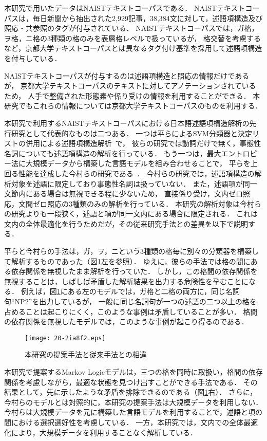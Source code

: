 \documentclass[japanese]{jnlp_1.4}
\begin{document}
本研究で用いたデータはNAISTテキストコーパスである．
NAISTテキストコーパスは，毎日新聞から抽出された2,929記事，38,384文に対して，述語項構造及び照応・共参照のタグが付与されている．
NAISTテキストコーパスでは，ガ格，ヲ格，ニ格の3種類の格のみを表層格レベルで扱っているが，
格交替を考慮するなど，京都大学テキストコーパスとは異なるタグ付け基準を採用して述語項構造を付与している．

NAISTテキストコーパスが付与するのは述語項構造と照応の情報だけであるが，
京都大学テキストコーパスのテキストに対してアノテーションされているため，
人手で整備された形態素や係り受けの情報を利用することができる．
本研究でもこれらの情報については京都大学テキストコーパスのものを利用する．

本研究で利用するNAISTテキストコーパスにおける日本語述語項構造解析の先行研究として代表的なものは二つある．
一つは平らによるSVM分類器と決定リストの併用による述語項構造解析~\cite{taira:2008:emnlp}で，
彼らの研究では動詞だけで無く，事態性名詞についても述語項構造の解析を行っている．
もう一つは，最大エントロピー法に大規模データから構築した言語モデルを組み合わせることで，
平らを上回る性能を達成した今村らの研究である~\cite{imamura:2009:acl}．
今村らの研究では，述語項構造の解析対象を述語に限定しており事態性名詞は扱っていない．
また，述語項が同一文節内にある場合は無視できる程に少ないため，
直接係り受け，文内ゼロ照応，文間ゼロ照応の3種類のみの解析を行っている．
本研究の解析対象は今村らの研究よりも一段狭く，述語と項が同一文内にある場合に限定される．
これは文内の全体最適化を行うためだが，その従来研究手法との差異を以下で説明する．

平らと今村らの手法は，ガ，ヲ，ニという3種類の格毎に別々の分類器を構築して解析するものであった（図\ref{models}左を参照）．
ゆえに，彼らの手法では格の間にある依存関係を無視したまま解析を行っていた．
しかし，この格間の依存関係を無視することは，しばしば矛盾した解析結果を出力する危険性を孕むことになる．
例えば，図\ref{models}にある左のモデルでは，ガ格と二格の両方に，同じ名詞句``NP2''を出力しているが，
一般に同じ名詞句が一つの述語の二つ以上の格を占めることは起こりにくく，このような事例は矛盾していることが多い．
格間の依存関係を無視したモデルでは，このような事例が起こり得るのである．

\begin{figure}[b]
\begin{center}
\texttt{[image: 20-2ia8f2.eps]}
\end{center}
\caption{本研究の提案手法と従来手法との相違}
        \label{models}
\end{figure}

本研究で提案するMarkov Logicモデルは，三つの格を同時に取扱い，格間の依存関係を考慮しながら，最適な状態を見つけ出すことができる手法である．
その結果として，先に示したような矛盾を排除できるのである（図\ref{models}右）．
さらに，今村らのモデルとは対照的に，本研究の提案手法は大規模データを利用しない．
今村らは大規模データを元に構築した言語モデルを利用することで，述語と項の間における選択選好性を考慮している．
一方，本研究では，文内での全体最適化により，大規模データを利用することなく解析している．
\end{document}
